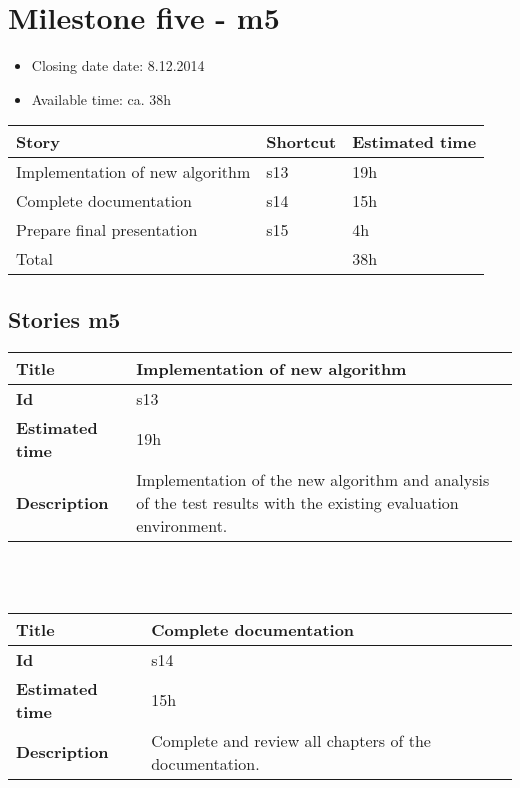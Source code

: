 \section{Milestone five - m5}

\begin{itemize}
\item Closing date date: 8.12.2014
\item Available time: ca. 38h
\end{itemize}

    \begin{tabular}{ | p{10cm} | p{2cm} | p{2cm} |}
    \hline
    \textbf{Story} & \textbf{Shortcut}& \textbf{Estimated time} \\ \hline
    Implementation of new algorithm & s13 & 19h \\
    Complete documentation & s14 & 15h \\
    Prepare final presentation & s15 & 4h \\ \hline
    Total &  & 38h\\
    \hline
    \end{tabular}

\subsection {Stories m5}

    \begin{tabular}{ | p{4cm} | p{10cm} |}
    \hline
    \textbf{Title} & Implementation of new algorithm\\ \hline
    \textbf{Id} & s13\\ \hline
    \textbf{Estimated time} & 19h \\ \hline
    \textbf{Description} &  Implementation of the new algorithm and analysis of the test results with the existing evaluation environment. \\ 
    \hline
    \end{tabular} \\\\


    \begin{tabular}{ | p{4cm} | p{10cm} |}
    \hline
    \textbf{Title} & Complete documentation\\ \hline
    \textbf{Id} & s14\\ \hline
    \textbf{Estimated time} & 15h \\ \hline
    \textbf{Description} &  Complete and review all chapters of the documentation.  \\ 
    \hline
    \end{tabular} \\\\

